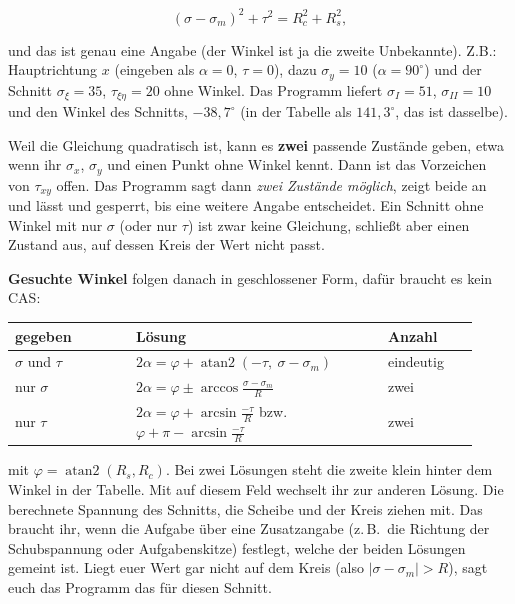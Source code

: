 \[
  (\sigma - \sigma_m)^2 + \tau^2 = R_c^2 + R_s^2 ,
\]

und das ist genau eine Angabe (der Winkel ist ja die zweite Unbekannte). Z.B.: Hauptrichtung $x$ (eingeben als $\alpha = 0$, $\tau = 0$), dazu
$\sigma_y = 10$ ($\alpha = 90^\circ$) und der Schnitt $\sigma_\xi = 35$, $\tau_{\xi\eta} = 20$ ohne
Winkel. Das Programm liefert $\sigma_I = 51$, $\sigma_{II} = 10$ und den Winkel des Schnitts,
$-38{,}7^\circ$ (in der Tabelle als $141{,}3^\circ$, das ist dasselbe).

Weil die Gleichung quadratisch ist, kann es \textbf{zwei} passende Zustände geben, etwa wenn ihr
$\sigma_x$, $\sigma_y$ und einen Punkt ohne Winkel kennt. Dann ist das Vorzeichen von $\tau_{xy}$
offen. Das Programm sagt dann \emph{zwei Zustände möglich}, zeigt beide an und lässt
 und  gesperrt, bis eine weitere Angabe entscheidet. Ein Schnitt ohne Winkel mit
nur $\sigma$ (oder nur $\tau$) ist zwar keine Gleichung, schließt aber einen Zustand aus, auf dessen
Kreis der Wert nicht passt.

\textbf{Gesuchte Winkel} folgen danach in geschlossener Form, dafür braucht es kein CAS:

\begin{longtable}{p{0.24\linewidth}p{0.50\linewidth}p{0.18\linewidth}}
  \toprule
  \textbf{gegeben} & \textbf{Lösung} & \textbf{Anzahl} \\
  \midrule \endhead
  $\sigma$ und $\tau$ & $2\alpha = \varphi + \operatorname{atan2}(-\tau,\ \sigma-\sigma_m)$ &
    eindeutig \\
  nur $\sigma$ & $2\alpha = \varphi \pm \arccos\frac{\sigma-\sigma_m}{R}$ & zwei \\
  nur $\tau$ & $2\alpha = \varphi + \arcsin\frac{-\tau}{R}$ bzw.\ $\varphi + \pi - \arcsin\frac{-\tau}{R}$ & zwei \\
  \bottomrule
\end{longtable}

mit $\varphi = \operatorname{atan2}(R_s, R_c)$. Bei zwei Lösungen steht die zweite klein hinter
dem Winkel in der Tabelle. Mit  auf diesem Feld wechselt ihr zur anderen Lösung. Die
berechnete Spannung des Schnitts, die Scheibe und der Kreis ziehen mit. Das braucht ihr, wenn die
Aufgabe über eine Zusatzangabe (z.\,B.\ die Richtung der Schubspannung oder Aufgabenskitze) festlegt, welche der beiden
Lösungen gemeint ist. Liegt euer Wert gar nicht auf dem Kreis (also
$|\sigma - \sigma_m| > R$), sagt euch das Programm das für diesen Schnitt.


